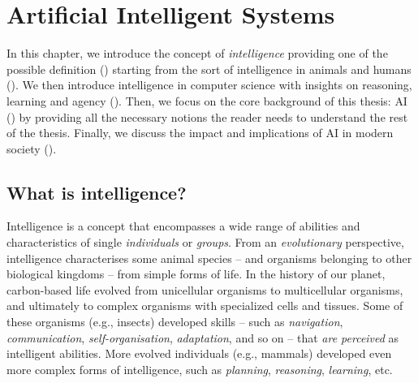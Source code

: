 
\chapter{Artificial Intelligent Systems}
\label{ch:intelligent-systems}
\mtcaddchapter
\minitoc


In this chapter, we introduce the concept of \emph{intelligence} providing one of the possible definition () starting from the sort of intelligence in animals and humans ().
%
We then introduce intelligence in computer science with insights on reasoning, learning and agency ().
%
Then, we focus on the core background of this thesis: \gls{AI} () by providing all the necessary notions the reader needs to understand the rest of the thesis.
%
Finally, we discuss the impact and implications of \gls{AI} in modern society ().


\section{What is intelligence?}\label{sec:what-is-intelligence}

Intelligence is a concept that encompasses a wide range of abilities and characteristics of single \emph{individuals} or \emph{groups}.
%
From an \emph{evolutionary} perspective, intelligence characterises some animal species -- and organisms belonging to other biological kingdoms -- from simple forms of life.
%
In the history of our planet, carbon-based life evolved from unicellular organisms to multicellular organisms, and ultimately to complex organisms with specialized cells and tissues.
%
Some of these organisms (e.g., insects) developed skills -- such as \emph{navigation}, \emph{communication}, \emph{self-organisation}, \emph{adaptation}, and so on -- that \emph{are perceived} as intelligent abilities.
%
More evolved individuals (e.g., mammals) developed even more complex forms of intelligence, such as \emph{planning}, \emph{reasoning}, \emph{learning}, etc.


